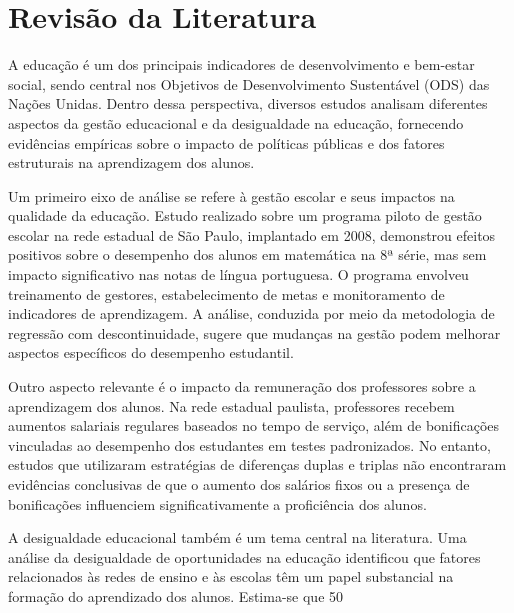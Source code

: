 \documentclass[a4paper,12pt]{article}
\begin{document}
\newpage

\section{Revisão da Literatura}


A educação é um dos principais indicadores de desenvolvimento e bem-estar social, sendo central nos Objetivos de Desenvolvimento Sustentável (ODS) das Nações Unidas. Dentro dessa perspectiva, diversos estudos analisam diferentes aspectos da gestão educacional e da desigualdade na educação, fornecendo evidências empíricas sobre o impacto de políticas públicas e dos fatores estruturais na aprendizagem dos alunos.

Um primeiro eixo de análise se refere à gestão escolar e seus impactos na qualidade da educação. Estudo realizado sobre um programa piloto de gestão escolar na rede estadual de São Paulo, implantado em 2008, demonstrou efeitos positivos sobre o desempenho dos alunos em matemática na 8ª série, mas sem impacto significativo nas notas de língua portuguesa. O programa envolveu treinamento de gestores, estabelecimento de metas e monitoramento de indicadores de aprendizagem. A análise, conduzida por meio da metodologia de regressão com descontinuidade, sugere que mudanças na gestão podem melhorar aspectos específicos do desempenho estudantil.

Outro aspecto relevante é o impacto da remuneração dos professores sobre a aprendizagem dos alunos. Na rede estadual paulista, professores recebem aumentos salariais regulares baseados no tempo de serviço, além de bonificações vinculadas ao desempenho dos estudantes em testes padronizados. No entanto, estudos que utilizaram estratégias de diferenças duplas e triplas não encontraram evidências conclusivas de que o aumento dos salários fixos ou a presença de bonificações influenciem significativamente a proficiência dos alunos.

A desigualdade educacional também é um tema central na literatura. Uma análise da desigualdade de oportunidades na educação identificou que fatores relacionados às redes de ensino e às escolas têm um papel substancial na formação do aprendizado dos alunos. Estima-se que 50%
\end{document}
